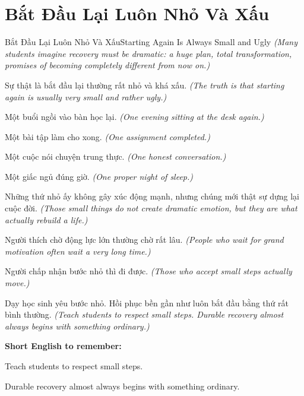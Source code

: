 \section{Bắt Đầu Lại Luôn Nhỏ Và Xấu}
\begin{truyen}{Bắt Đầu Lại Luôn Nhỏ Và Xấu}{Starting Again Is Always Small and Ugly}
\textit{(Many students imagine recovery must be dramatic: a huge plan, total transformation, promises of becoming completely different from now on.)}

Sự thật là bắt đầu lại thường rất nhỏ và khá xấu.
\textit{(The truth is that starting again is usually very small and rather ugly.)}

Một buổi ngồi vào bàn học lại.
\textit{(One evening sitting at the desk again.)}

Một bài tập làm cho xong.
\textit{(One assignment completed.)}

Một cuộc nói chuyện trung thực.
\textit{(One honest conversation.)}

Một giấc ngủ đúng giờ.
\textit{(One proper night of sleep.)}

Những thứ nhỏ ấy không gây xúc động mạnh, nhưng chúng mới thật sự dựng lại cuộc đời.
\textit{(Those small things do not create dramatic emotion, but they are what actually rebuild a life.)}

Người thích chờ động lực lớn thường chờ rất lâu.
\textit{(People who wait for grand motivation often wait a very long time.)}

Người chấp nhận bước nhỏ thì đi được.
\textit{(Those who accept small steps actually move.)}

\end{truyen}

\begin{baihoc}
Dạy học sinh yêu bước nhỏ. Hồi phục bền gần như luôn bắt đầu bằng thứ rất bình thường.
\textit{(Teach students to respect small steps. Durable recovery almost always begins with something ordinary.)}
\end{baihoc}

\begin{ghinhoanh}
\textbf{Short English to remember:}

Teach students to respect small steps.

Durable recovery almost always begins with something ordinary.

\end{ghinhoanh}

